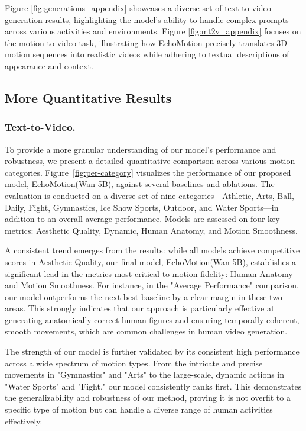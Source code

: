 Figure \ref{fig:generations_appendix} showcases a diverse set of text-to-video generation results, highlighting the model's ability to handle complex prompts across various activities and environments. Figure \ref{fig:mt2v_appendix} focuses on the motion-to-video task, illustrating how EchoMotion precisely translates 3D motion sequences into realistic videos while adhering to textual descriptions of appearance and context.



\subsection{More Quantitative Results}\label{sec:appendix_quant_results}

\subsubsection{Text-to-Video.}
To provide a more granular understanding of our model's performance and robustness, we present a detailed quantitative comparison across various motion categories. Figure~\ref{fig:per-category} visualizes the performance of our proposed model, EchoMotion(Wan-5B), against several baselines and ablations. The evaluation is conducted on a diverse set of nine categories—Athletic, Arts, Ball, Daily, Fight, Gymnastics, Ice Show Sports, Outdoor, and Water Sports—in addition to an overall average performance. Models are assessed on four key metrics: Aesthetic Quality, Dynamic, Human Anatomy, and Motion Smoothness.

A consistent trend emerges from the results: while all models achieve competitive scores in Aesthetic Quality, our final model, EchoMotion(Wan-5B), establishes a significant lead in the metrics most critical to motion fidelity: Human Anatomy and Motion Smoothness. For instance, in the "Average Performance" comparison, our model outperforms the next-best baseline by a clear margin in these two areas. This strongly indicates that our approach is particularly effective at generating anatomically correct human figures and ensuring temporally coherent, smooth movements, which are common challenges in human video generation.

The strength of our model is further validated by its consistent high performance across a wide spectrum of motion types. From the intricate and precise movements in "Gymnastics" and "Arts" to the large-scale, dynamic actions in "Water Sports" and "Fight," our model consistently ranks first. This demonstrates the generalizability and robustness of our method, proving it is not overfit to a specific type of motion but can handle a diverse range of human activities effectively.

